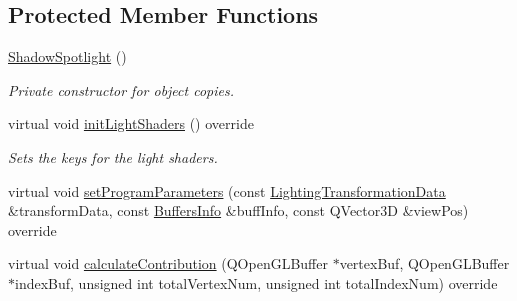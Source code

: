 \subsection*{Protected Member Functions}
\begin{DoxyCompactItemize}
\item 
\mbox{\label{class_geometry_engine_1_1_geometry_world_item_1_1_geometry_light_1_1_shadow_spotlight_a04be4c24cb97cd885f53dd4bc485bc46}} 
\mbox{\hyperlink{class_geometry_engine_1_1_geometry_world_item_1_1_geometry_light_1_1_shadow_spotlight_a04be4c24cb97cd885f53dd4bc485bc46}{Shadow\+Spotlight}} ()
\begin{DoxyCompactList}\small\item\em Private constructor for object copies. \end{DoxyCompactList}\item 
\mbox{\label{class_geometry_engine_1_1_geometry_world_item_1_1_geometry_light_1_1_shadow_spotlight_aa4de61784b3cdb56739255fbcc00818c}} 
virtual void \mbox{\hyperlink{class_geometry_engine_1_1_geometry_world_item_1_1_geometry_light_1_1_shadow_spotlight_aa4de61784b3cdb56739255fbcc00818c}{init\+Light\+Shaders}} () override
\begin{DoxyCompactList}\small\item\em Sets the keys for the light shaders. \end{DoxyCompactList}\item 
virtual void \mbox{\hyperlink{class_geometry_engine_1_1_geometry_world_item_1_1_geometry_light_1_1_shadow_spotlight_af274f65e3b888dd73ad7d89efdbe5ce4}{set\+Program\+Parameters}} (const \mbox{\hyperlink{class_geometry_engine_1_1_lighting_transformation_data}{Lighting\+Transformation\+Data}} \&transform\+Data, const \mbox{\hyperlink{class_geometry_engine_1_1_buffers_info}{Buffers\+Info}} \&buff\+Info, const Q\+Vector3D \&view\+Pos) override
\item 
virtual void \mbox{\hyperlink{class_geometry_engine_1_1_geometry_world_item_1_1_geometry_light_1_1_shadow_spotlight_a27163f2f8903220d7eaae7aa70c9d6e6}{calculate\+Contribution}} (Q\+Open\+G\+L\+Buffer $\ast$vertex\+Buf, Q\+Open\+G\+L\+Buffer $\ast$index\+Buf, unsigned int total\+Vertex\+Num, unsigned int total\+Index\+Num) override
\item 
\mbox{\label{class_geometry_engine_1_1_geometry_world_item_1_1_geometry_light_1_1_shadow_spotlight_a93e2c91b4377ecb98cf4c0409364c7be}} 

\end{DoxyCompactItemize}
